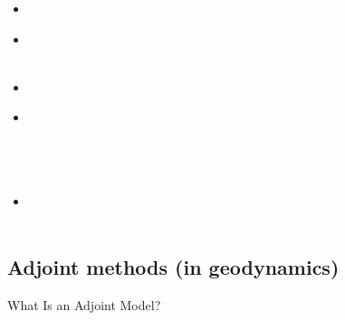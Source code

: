 \begin{scriptsize}
\begin{itemize}
\textcite{bocf16} \\
\textcite{yagu16} \\
\textcite{baum16} \\
\textcite{pric16} \\
\item[\twothousandseventeen] 
\textcite{zhli17} \\
\item[\twothousandeighteen] 
\textcite{bofc18} \\
\textcite{shyp18} \\
\item[\twothousandnineteen]
\textcite{wahg19} \\
\item[\twothousandtwenty] 
\textcite{lufs20} \\
\textcite{ruml20} \\
\textcite{orza20} \\
\textcite{moku20} \\
\item[\twothousandtwentyone] 
\textcite{mabh21} \\
\textcite{reub21} \\
\end{itemize}
\end{scriptsize}


\subsection{Adjoint methods (in geodynamics)}

What Is an Adjoint Model? \cite{erri97}

